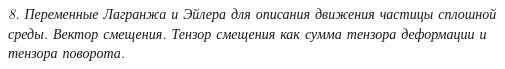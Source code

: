 \emph{8. Переменные Лагранжа и Эйлера для описания движения частицы сплошной
среды. Вектор смещения. Тензор смещения как сумма тензора деформации и тензора
поворота.}

\newpage
